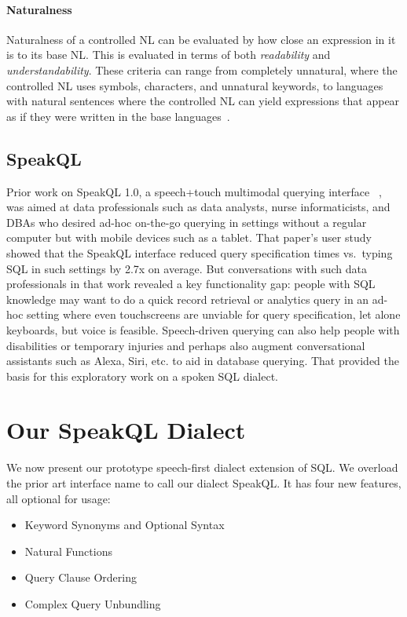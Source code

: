 \paragraph{Naturalness}

Naturalness of a controlled NL can be evaluated by how close an expression in it is to its base NL. 
This is evaluated in terms of both \emph{readability} and \emph{understandability}. 
These criteria can range from completely unnatural, where the controlled NL uses symbols, characters, and unnatural keywords, to languages with natural sentences where the controlled NL can yield expressions that appear as if they were written in the base languages~\cite{10.1162/COLI_a_00168}.

\subsection{SpeakQL}

Prior work on SpeakQL 1.0, a speech+touch multimodal querying interface ~\cite{Shah2020}, was aimed at data professionals such as data analysts, nurse informaticists, and DBAs who desired ad-hoc on-the-go querying in settings without a regular computer but with mobile devices such as a tablet. 
That paper's user study showed that the SpeakQL interface reduced query specification times vs.~typing SQL in such settings by 2.7x on average. 
But conversations with such data professionals in that work revealed a key functionality gap: 
people with SQL knowledge may want to do a quick record retrieval or analytics query in an ad-hoc setting where even touchscreens are unviable for query specification, let alone keyboards, but voice is feasible. 
Speech-driven querying can also help people with disabilities or temporary injuries and perhaps also augment conversational assistants such as Alexa, Siri, etc. to aid in database querying. 
That provided the basis for this exploratory work on a spoken SQL dialect. 



\section{Our SpeakQL Dialect}


We now present our prototype speech-first dialect extension of SQL. 
We overload the prior art interface name to call our dialect SpeakQL.  
It has four new features, all optional for usage:

\begin{itemize}
  \item Keyword Synonyms and Optional Syntax
  \item Natural Functions
  \item Query Clause Ordering
  \item Complex Query Unbundling
\end{itemize}

